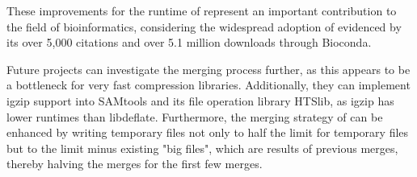 These improvements for the runtime of \sort represent an important contribution to the field of bioinformatics, considering the widespread adoption of \sort evidenced by its over 5,000 citations and over 5.1 million downloads through Bioconda.

Future projects can investigate the merging process further, as this appears to be a bottleneck for very fast compression libraries. Additionally, they can implement igzip support into SAMtools and its file operation library HTSlib, as igzip has lower runtimes than libdeflate. Furthermore, the merging strategy of \sort can be enhanced by writing temporary files not only to half the limit for temporary files but to the limit minus existing "big files", which are results of previous merges, thereby halving the merges for the first few merges.